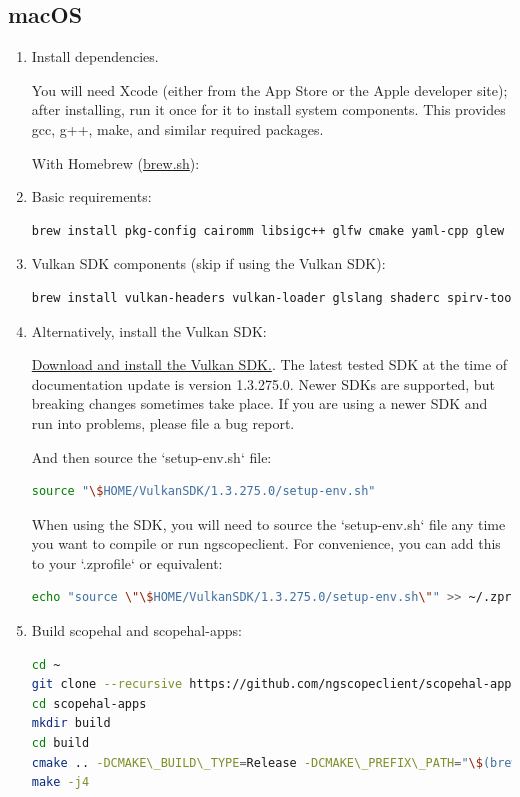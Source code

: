 \subsection{macOS}
\begin{enumerate}

\item Install dependencies.

You will need Xcode (either from the App Store or the Apple developer site); after installing, run it once for it
to install system components. This provides gcc, g++, make, and similar required packages.

With Homebrew (\href{https://brew.sh}{brew.sh}):

\item Basic requirements:
\begin{lstlisting}[language=sh, numbers=none]
brew install pkg-config cairomm libsigc++ glfw cmake yaml-cpp glew catch2 libomp
\end{lstlisting}

\item Vulkan SDK components (skip if using the Vulkan SDK):
\begin{lstlisting}[language=sh, numbers=none]
brew install vulkan-headers vulkan-loader glslang shaderc spirv-tools molten-vk
\end{lstlisting}

\item Alternatively, install the Vulkan SDK:

 \href{https://vulkan.lunarg.com/sdk/home}{Download and install the Vulkan SDK.}.
The latest tested SDK at the time of documentation update is version 1.3.275.0. Newer SDKs are supported, but breaking
changes sometimes take place.
If you are using a newer SDK and run into problems, please file a bug report.

And then source the `setup-env.sh` file:
\begin{lstlisting}[language=sh, numbers=none]
source "\$HOME/VulkanSDK/1.3.275.0/setup-env.sh"
\end{lstlisting}

When using the SDK, you will need to source the `setup-env.sh` file any time you want to compile or run ngscopeclient.
For convenience, you can add this to your `.zprofile` or equivalent:
\begin{lstlisting}[language=sh, numbers=none]
echo "source \"\$HOME/VulkanSDK/1.3.275.0/setup-env.sh\"" >> ~/.zprofile
\end{lstlisting}

\item Build scopehal and scopehal-apps:

\begin{lstlisting}[language=sh, numbers=none]
cd ~
git clone --recursive https://github.com/ngscopeclient/scopehal-apps.git
cd scopehal-apps
mkdir build
cd build
cmake .. -DCMAKE\_BUILD\_TYPE=Release -DCMAKE\_PREFIX\_PATH="\$(brew --prefix);\$(brew --prefix)/opt/libomp"
make -j4
\end{lstlisting}

\end{enumerate}

